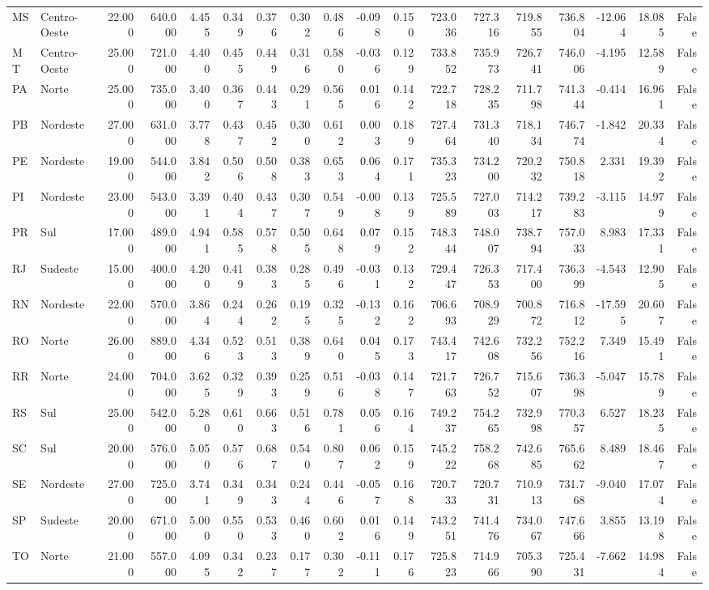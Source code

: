 \begin{tabular}{llrrrrrrrrrrrrrrrr}
MS & Centro-Oeste & 22.000 & 640.000 & 4.455 & 0.349 & 0.376 & 0.302 & 0.486 & -0.098 & 0.150 & 723.036 & 727.316 & 719.855 & 736.804 & -12.064 & 18.085 & False \\
MT & Centro-Oeste & 25.000 & 721.000 & 4.400 & 0.455 & 0.449 & 0.316 & 0.580 & -0.036 & 0.129 & 733.852 & 735.973 & 726.741 & 746.006 & -4.195 & 12.589 & False \\
PA & Norte & 25.000 & 735.000 & 3.400 & 0.367 & 0.443 & 0.291 & 0.565 & 0.016 & 0.142 & 722.718 & 728.235 & 711.798 & 741.344 & -0.414 & 16.961 & False \\
PB & Nordeste & 27.000 & 631.000 & 3.778 & 0.437 & 0.452 & 0.300 & 0.612 & 0.003 & 0.189 & 727.464 & 731.340 & 718.134 & 746.774 & -1.842 & 20.334 & False \\
PE & Nordeste & 19.000 & 544.000 & 3.842 & 0.506 & 0.508 & 0.383 & 0.653 & 0.064 & 0.171 & 735.323 & 734.200 & 720.232 & 750.818 & 2.331 & 19.392 & False \\
PI & Nordeste & 23.000 & 543.000 & 3.391 & 0.404 & 0.437 & 0.307 & 0.549 & -0.008 & 0.139 & 725.589 & 727.003 & 714.217 & 739.283 & -3.115 & 14.979 & False \\
PR & Sul & 17.000 & 489.000 & 4.941 & 0.585 & 0.578 & 0.505 & 0.648 & 0.079 & 0.152 & 748.344 & 748.007 & 738.794 & 757.033 & 8.983 & 17.331 & False \\
RJ & Sudeste & 15.000 & 400.000 & 4.200 & 0.419 & 0.383 & 0.285 & 0.496 & -0.031 & 0.132 & 729.447 & 726.353 & 717.400 & 736.399 & -4.543 & 12.905 & False \\
RN & Nordeste & 22.000 & 570.000 & 3.864 & 0.244 & 0.262 & 0.195 & 0.325 & -0.132 & 0.162 & 706.693 & 708.929 & 700.872 & 716.812 & -17.595 & 20.607 & False \\
RO & Norte & 26.000 & 889.000 & 4.346 & 0.523 & 0.513 & 0.389 & 0.640 & 0.045 & 0.173 & 743.417 & 742.608 & 732.256 & 752.216 & 7.349 & 15.491 & False \\
RR & Norte & 24.000 & 704.000 & 3.625 & 0.329 & 0.393 & 0.259 & 0.516 & -0.038 & 0.147 & 721.763 & 726.752 & 715.607 & 736.398 & -5.047 & 15.789 & False \\
RS & Sul & 25.000 & 542.000 & 5.280 & 0.610 & 0.663 & 0.516 & 0.781 & 0.056 & 0.164 & 749.237 & 754.265 & 732.998 & 770.357 & 6.527 & 18.235 & False \\
SC & Sul & 20.000 & 576.000 & 5.050 & 0.576 & 0.687 & 0.540 & 0.807 & 0.062 & 0.159 & 745.222 & 758.268 & 742.685 & 765.662 & 8.489 & 18.467 & False \\
SE & Nordeste & 27.000 & 725.000 & 3.741 & 0.349 & 0.343 & 0.244 & 0.446 & -0.057 & 0.168 & 720.733 & 720.731 & 710.913 & 731.768 & -9.040 & 17.074 & False \\
SP & Sudeste & 20.000 & 671.000 & 5.000 & 0.550 & 0.533 & 0.460 & 0.602 & 0.016 & 0.149 & 743.251 & 741.476 & 734.067 & 747.666 & 3.855 & 13.198 & False \\
TO & Norte & 21.000 & 557.000 & 4.095 & 0.342 & 0.237 & 0.177 & 0.302 & -0.111 & 0.176 & 725.823 & 714.966 & 705.390 & 725.431 & -7.662 & 14.984 & False \\
\bottomrule
\end{tabular}
